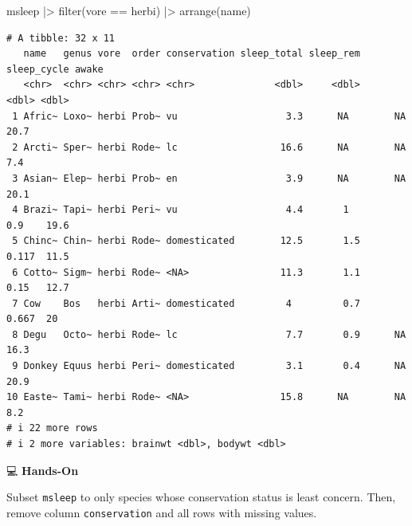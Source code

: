 \documentclass[
  letterpaper,
  DIV=11,
  numbers=noendperiod]{scrreprt}
\newenvironment{Shaded}{\begin{snugshade}}{\end{snugshade}}
\newcommand{\FunctionTok}[1]{\textcolor[rgb]{0.28,0.35,0.67}{#1}}
\newcommand{\NormalTok}[1]{\textcolor[rgb]{0.00,0.23,0.31}{#1}}
\newcommand{\SpecialCharTok}[1]{\textcolor[rgb]{0.37,0.37,0.37}{#1}}
\newcommand{\StringTok}[1]{\textcolor[rgb]{0.13,0.47,0.30}{#1}}
\begin{document}
\begin{tcolorbox}[enhanced jigsaw, colbacktitle=quarto-callout-tip-color!10!white, opacitybacktitle=0.6, breakable, left=2mm, leftrule=.75mm, toprule=.15mm, toptitle=1mm, bottomtitle=1mm, colframe=quarto-callout-tip-color-frame, opacityback=0, coltitle=black, arc=.35mm, titlerule=0mm, colback=white, bottomrule=.15mm, title=\textcolor{quarto-callout-tip-color}{\faLightbulb}\hspace{0.5em}{Answer}, rightrule=.15mm]

\begin{Shaded}
\begin{Highlighting}[]
\NormalTok{msleep }\SpecialCharTok{|\textgreater{}}
  \FunctionTok{filter}\NormalTok{(vore }\SpecialCharTok{==} \StringTok{\textquotesingle{}herbi\textquotesingle{}}\NormalTok{) }\SpecialCharTok{|\textgreater{}}
  \FunctionTok{arrange}\NormalTok{(name)}
\end{Highlighting}
\end{Shaded}

\begin{verbatim}
# A tibble: 32 x 11
   name   genus vore  order conservation sleep_total sleep_rem sleep_cycle awake
   <chr>  <chr> <chr> <chr> <chr>              <dbl>     <dbl>       <dbl> <dbl>
 1 Afric~ Loxo~ herbi Prob~ vu                   3.3      NA        NA      20.7
 2 Arcti~ Sper~ herbi Rode~ lc                  16.6      NA        NA       7.4
 3 Asian~ Elep~ herbi Prob~ en                   3.9      NA        NA      20.1
 4 Brazi~ Tapi~ herbi Peri~ vu                   4.4       1         0.9    19.6
 5 Chinc~ Chin~ herbi Rode~ domesticated        12.5       1.5       0.117  11.5
 6 Cotto~ Sigm~ herbi Rode~ <NA>                11.3       1.1       0.15   12.7
 7 Cow    Bos   herbi Arti~ domesticated         4         0.7       0.667  20  
 8 Degu   Octo~ herbi Rode~ lc                   7.7       0.9      NA      16.3
 9 Donkey Equus herbi Peri~ domesticated         3.1       0.4      NA      20.9
10 Easte~ Tami~ herbi Rode~ <NA>                15.8      NA        NA       8.2
# i 22 more rows
# i 2 more variables: brainwt <dbl>, bodywt <dbl>
\end{verbatim}

\end{tcolorbox}

💻 \textbf{Hands-On}

Subset \texttt{msleep} to only species whose conservation status is
least concern. Then, remove column \texttt{conservation} and all rows
with missing values.
\end{document}
